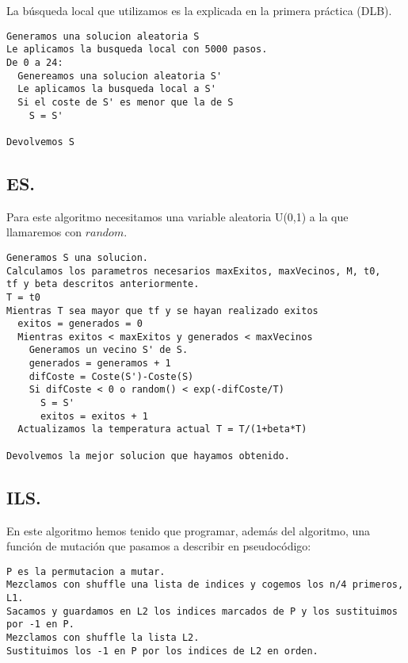 La búsqueda local que utilizamos es la explicada en la primera práctica (DLB).\\


\noindent\hrulefill

\begin{lstlisting}
Generamos una solucion aleatoria S
Le aplicamos la busqueda local con 5000 pasos.
De 0 a 24:
  Genereamos una solucion aleatoria S'
  Le aplicamos la busqueda local a S'
  Si el coste de S' es menor que la de S
    S = S'
    
Devolvemos S
\end{lstlisting}

\noindent\hrulefill

\subsection{ES.}
Para este algoritmo necesitamos una variable aleatoria U(0,1) a la que llamaremos con $random$.\\

\noindent\hrulefill


\begin{lstlisting}
Generamos S una solucion.
Calculamos los parametros necesarios maxExitos, maxVecinos, M, t0, 
tf y beta descritos anteriormente.
T = t0
Mientras T sea mayor que tf y se hayan realizado exitos 
  exitos = generados = 0
  Mientras exitos < maxExitos y generados < maxVecinos
    Generamos un vecino S' de S.
    generados = generamos + 1
    difCoste = Coste(S')-Coste(S)
    Si difCoste < 0 o random() < exp(-difCoste/T)
      S = S'
      exitos = exitos + 1
  Actualizamos la temperatura actual T = T/(1+beta*T)
    
Devolvemos la mejor solucion que hayamos obtenido.
\end{lstlisting}
\noindent\hrulefill
\newpage

\subsection{ILS.}

En este algoritmo hemos tenido que programar, además del algoritmo, una función de mutación que pasamos a describir en pseudocódigo:\\

\noindent\hrulefill
\begin{lstlisting}
P es la permutacion a mutar.
Mezclamos con shuffle una lista de indices y cogemos los n/4 primeros, L1.
Sacamos y guardamos en L2 los indices marcados de P y los sustituimos por -1 en P.
Mezclamos con shuffle la lista L2.
Sustituimos los -1 en P por los indices de L2 en orden.
\end{lstlisting}
\noindent\hrulefill

